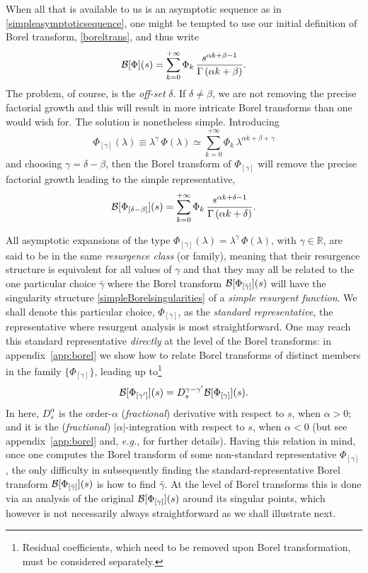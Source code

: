 \documentclass[11pt,a4paper]{article}
\newcommand{\CB}{{\cal B}}
\def\BR{{\mathbb R}}
\newcommand{\be}{\begin{equation}}
\newcommand{\ee}{\end{equation}}
\begin{document}
When all that is available to us is an asymptotic sequence as in \eqref{simpleasymptoticsequence}, one might be tempted to use our initial definition of Borel transform, \eqref{boreltrans}, and thus write
%
\be
\CB [\Phi] (s) = \sum_{k=0}^{+\infty} \Phi_k\, \frac{s^{\alpha k + \beta - 1}}{\Gamma \left( \alpha k + \beta \right)}.
\ee
%
\noindent
The problem, of course, is the \textit{off-set} $\delta$. If $\delta \neq \beta$, we are not removing the precise factorial growth and this will result in more intricate Borel transforms than one would wish for. The solution is nonetheless simple. Introducing
%
\be
\label{Phi_[gamma]-DEF}
\Phi_{[\gamma]} (\lambda) \equiv \lambda^\gamma\, \Phi (\lambda) \simeq \sum_{k=0}^{+\infty} \Phi_k\, \lambda^{\alpha k + \beta + \gamma}
\ee
%
\noindent
and choosing $\gamma = \delta-\beta$, then the Borel transform of $\Phi_{[\gamma]}$ will remove the precise factorial growth leading to the simple representative,
%
\be
\CB [\Phi_{[\delta-\beta]}] (s) = \sum_{k=0}^{+\infty} \Phi_k\, \frac{s^{\alpha k + \delta - 1}}{\Gamma \left( \alpha k + \delta \right)}.
\ee

All asymptotic expansions of the type $\Phi_{[\gamma]} (\lambda) = \lambda^\gamma\, \Phi (\lambda)$, with $\gamma \in \BR$, are said to be in the same \textit{resurgence class} (or family), meaning that their resurgence structure is equivalent for all values of $\gamma$ and that they may all be related to the one particular choice $\bar{\gamma}$ where the Borel transform $\CB [\Phi_{[\bar{\gamma}]}] (s)$ will have the singularity structure \eqref{simpleBorelsingularities} of a \textit{simple resurgent function}. We shall denote this particular choice, $\Phi_{[\bar{\gamma}]}$, as the \textit{standard representative}, the representative where resurgent analysis is most straightforward. One may reach this standard representative \textit{directly} at the level of the Borel transforms: in appendix~\ref{app:borel} we show how to relate Borel transforms of distinct members in the family $\{ \Phi_{[\gamma]} \}$, leading up to\footnote{Residual coefficients, which need to be removed upon Borel transformation, must be considered separately.}
%
\begin{equation}
\label{eq:finding-Borel-rep-from-other}
\CB [\Phi_{[\gamma']}] (s) = D_s^{\gamma-\gamma'} \CB [\Phi_{[\gamma]}] (s).
\end{equation}
%
\noindent
In here, $D_s^{\alpha}$ is the order-$\alpha$ (\textit{fractional}) derivative with respect to $s$, when $\alpha>0$; and it is the (\textit{fractional}) $|\alpha|$-integration with respect to $s$, when $\alpha<0$ (but see appendix~\ref{app:borel} and, \textit{e.g.}, \cite{lot76} for further details). Having this relation in mind, once one computes the Borel transform of some non-standard representative $\Phi_{[\gamma]}$, the only difficulty in subsequently finding the standard-representative Borel transform $\CB [\Phi_{[\bar{\gamma}]}] (s)$ is how to find $\bar{\gamma}$. At the level of Borel transforms this is done via an analysis of the original $\CB [\Phi_{[\gamma]}] (s)$ around its singular points, which however is not necessarily always straightforward as we shall illustrate next.
\end{document}
